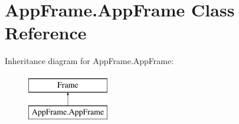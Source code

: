 \hypertarget{classAppFrame_1_1AppFrame}{}\section{App\+Frame.\+App\+Frame Class Reference}
\label{classAppFrame_1_1AppFrame}
Inheritance diagram for App\+Frame.\+App\+Frame\+:\begin{figure}[H]
\begin{center}
\leavevmode
\includegraphics[height=2.000000cm]{classAppFrame_1_1AppFrame}
\end{center}
\end{figure}
